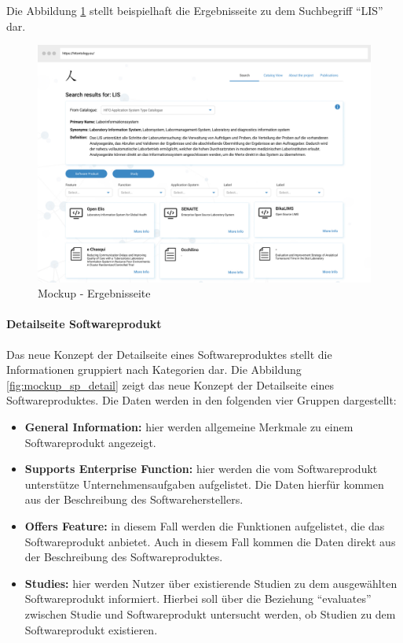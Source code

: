 Die Abbildung \ref{fig:mockup_results} stellt beispielhaft die Ergebnisseite zu dem Suchbegriff \enquote{LIS} dar.

\begin{figure}[H]
	\centering
    	\includegraphics[width=\textwidth]{Images/Mockup_Ergebnisseite}
   	\caption{Mockup - Ergebnisseite}
   	\label{fig:mockup_results}
\end{figure}

\paragraph{Detailseite Softwareprodukt}

Das neue Konzept der Detailseite eines Softwareproduktes stellt die Informationen gruppiert nach Kategorien dar.
Die Abbildung \ref{fig:mockup_sp_detail} zeigt das neue Konzept der Detailseite eines Softwareproduktes.
Die Daten werden in den folgenden vier Gruppen dargestellt:

\begin{itemize}
\item \textbf{General Information:} hier werden allgemeine Merkmale zu einem Softwareprodukt angezeigt.
\item \textbf{Supports Enterprise Function:} hier werden die vom Softwareprodukt unterstütze Unternehmensaufgaben aufgelistet. Die Daten hierfür kommen aus der Beschreibung des Softwareherstellers.
\item \textbf{Offers Feature:} in diesem Fall werden die Funktionen aufgelistet, die das Softwareprodukt anbietet. Auch in diesem Fall kommen die Daten direkt aus der Beschreibung des Softwareproduktes.
\item \textbf{Studies:} hier werden Nutzer über existierende Studien zu dem ausgewählten Softwareprodukt informiert. Hierbei soll über die Beziehung \enquote{evaluates} zwischen Studie und Softwareprodukt untersucht werden, ob  Studien zu dem Softwareprodukt existieren.
\end{itemize}

